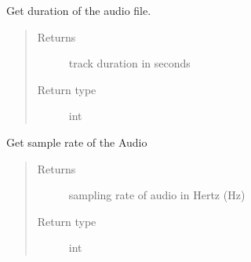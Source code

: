 \documentclass[letterpaper,10pt,english]{sphinxmanual}
\begin{document}
\begin{fulllineitems}
\begin{fulllineitems}
\label{\detokenize{docs/source/preprocess:preprocess.track_classes.Audio.duration}}
Get duration of the audio file.
\begin{quote}\begin{description}
\item[{Returns}] \leavevmode
track duration in seconds

\item[{Return type}] \leavevmode
int

\end{description}\end{quote}

\end{fulllineitems}


\begin{fulllineitems}
\label{\detokenize{docs/source/preprocess:preprocess.track_classes.Audio.sr}}
Get sample rate of the Audio
\begin{quote}\begin{description}
\item[{Returns}] \leavevmode
sampling rate of audio in Hertz (Hz)

\item[{Return type}] \leavevmode
int

\end{description}\end{quote}

\end{fulllineitems}


\end{fulllineitems}

\end{document}
